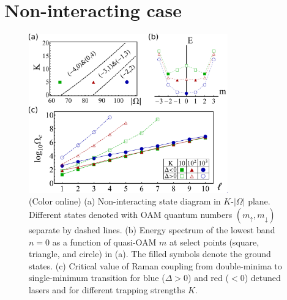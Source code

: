 \documentclass[twocolumn,pra,unsortedaddress,showpacs,floatfix,citeautoscript,nofootinbib]{revtex4-1}
\begin{document}
\vspace{-0.3cm}
\section{Non-interacting case}
\label{Sec-single} \vspace{-0.3cm}

\begin{figure}[t]
\vspace{-0.4cm} \centering
\includegraphics[width=8.6cm]{Fig2.pdf}\vspace{-0.4cm}
\caption{(Color online) (a) Non-interacting state diagram in
$K$-$|\Omega|$ plane. Different states denoted with OAM quantum
numbers $(m_\uparrow,m_\downarrow)$ separate by dashed lines. (b)
Energy spectrum of the lowest band $n=0$ as a function of
quasi-OAM $m$ at select points (square, triangle, and circle) in
(a). The filled symbols denote the ground states. (c) Critical
value of
Raman coupling from double-minima to single-minimum transition for blue ($%
\Delta>0$) and red ($<0$) detuned lasers and for different
trapping strengths $K$.} \vspace{-0.4cm} \label{ref-fig2}
\end{figure}
\end{document}
